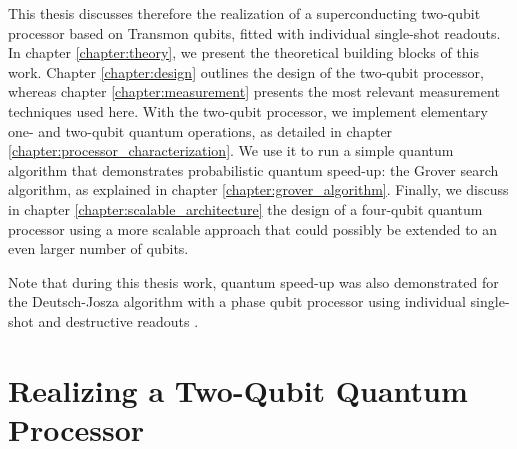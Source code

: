 \smallskip

This thesis discusses therefore the realization of
a superconducting two-qubit processor based on Transmon qubits, fitted
with individual single-shot readouts. In chapter \ref{chapter:theory}, we present the theoretical building blocks of this work. Chapter \ref{chapter:design} outlines the design of the two-qubit processor, whereas chapter \ref{chapter:measurement} presents the most relevant measurement techniques used here. With the two-qubit processor, we implement
elementary one- and two-qubit quantum operations, as detailed in chapter \ref{chapter:processor_characterization}. We use it to run
a simple quantum algorithm that demonstrates probabilistic quantum
speed-up: the Grover search algorithm, as explained in chapter \ref{chapter:grover_algorithm}. Finally, we discuss in chapter \ref{chapter:scalable_architecture} the design of a four-qubit quantum processor using a more scalable approach that
could possibly be extended to an even larger number of qubits.

Note that during this thesis work, quantum speed-up
was also demonstrated for the Deutsch-Josza algorithm with a phase
qubit processor using individual single-shot and destructive readouts
\citep{yamamoto_quantum_2010}.


\section{Realizing a Two-Qubit Quantum Processor}

